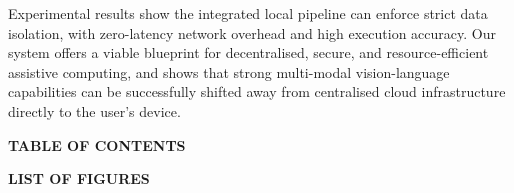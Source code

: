 \documentclass[12pt,a4paper]{report}
\begin{document}
\noindent Experimental results show the integrated local pipeline can enforce strict data isolation, with zero-latency network overhead and high execution accuracy. Our system offers a viable blueprint for decentralised, secure, and resource-efficient assistive computing, and shows that strong multi-modal vision-language capabilities can be successfully shifted away from centralised cloud infrastructure directly to the user’s device.

\clearpage
\pagestyle{logoheader}
\thispagestyle{logoheader}
 
\begin{center}
    \vspace{1cm}
    {\large \textbf{TABLE OF CONTENTS}}
\end{center}

\vspace*{1cm}

\begin{center}
    \begingroup
    \renewcommand{\clearpage}{}
    \renewcommand{\chapter}[2]{}
    \tableofcontents
    \endgroup
\end{center}
 
 
\clearpage
\pagestyle{logoheader}
\thispagestyle{logoheader}
 
\begin{center}
    \vspace{1cm}
    {\large \textbf{LIST OF FIGURES}}\\
    \vspace{1cm}
\end{center}
 
\end{document}
